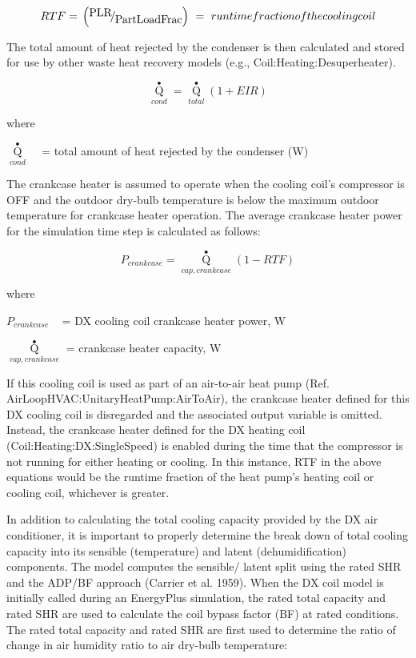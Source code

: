 \begin{equation}
RTF{\rm{ }} = {\rm{ }}\left( {{\raise0.7ex\hbox{{PLR}} \!\mathord{\left/ {\vphantom {{PLR} {PartLoadFrac}}}\right.}\!\lower0.7ex\hbox{{PartLoadFrac}}}} \right)\,\, = \,\,runtime fraction of the cooling coil
\end{equation}

The total amount of heat rejected by the condenser is then calculated and stored for use by other waste heat recovery models (e.g., Coil:Heating:Desuperheater).

\begin{equation}
{\mathop Q\limits^ \bullet_{cond}} = {\mathop Q\limits^ \bullet_{total}}\left( {1 + EIR} \right)
\end{equation}

where

\({\mathop Q\limits^ \bullet_{cond}}\) ~ = total amount of heat rejected by the condenser (W)

The crankcase heater is assumed to operate when the cooling coil's compressor is OFF and the outdoor dry-bulb temperature is below the maximum outdoor temperature for crankcase heater operation. The average crankcase heater power for the simulation time step is calculated as follows:

\begin{equation}
{P_{crankcase}} = {\mathop Q\limits^ \bullet_{cap,crankcase}}\left( {1 - RTF} \right)
\end{equation}

where

\({P_{crankcase}}\) ~ = DX cooling coil crankcase heater power, W

\({\mathop Q\limits^ \bullet_{cap,crankcase}}\) = crankcase heater capacity, W

If this cooling coil is used as part of an air-to-air heat pump (Ref. AirLoopHVAC:UnitaryHeatPump:AirToAir), the crankcase heater defined for this DX cooling coil is disregarded and the associated output variable is omitted. Instead, the crankcase heater defined for the DX heating coil (Coil:Heating:DX:SingleSpeed) is enabled during the time that the compressor is not running for either heating or cooling. In this instance, RTF in the above equations would be the runtime fraction of the heat pump's heating coil or cooling coil, whichever is greater.

In addition to calculating the total cooling capacity provided by the DX air conditioner, it is important to properly determine the break down of total cooling capacity into its sensible (temperature) and latent (dehumidification) components. The model computes the sensible/ latent split using the rated SHR and the ADP/BF approach (Carrier et al. 1959). When the DX coil model is initially called during an EnergyPlus simulation, the rated total capacity and rated SHR are used to calculate the coil bypass factor (BF) at rated conditions. The rated total capacity and rated SHR are first used to determine the ratio of change in air humidity ratio to air dry-bulb temperature:

